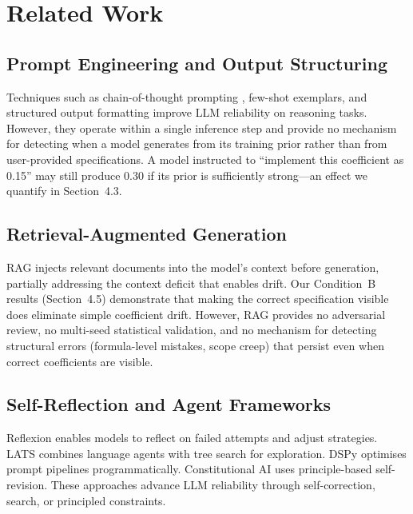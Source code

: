 \documentclass[11pt,a4paper]{article}
\begin{document}
\section{Related Work}

\subsection{Prompt Engineering and Output Structuring}

Techniques such as chain-of-thought prompting \citep{wei2022}, few-shot exemplars, and structured output formatting improve LLM reliability on reasoning tasks. However, they operate within a single inference step and provide no mechanism for detecting when a model generates from its training prior rather than from user-provided specifications. A model instructed to ``implement this coefficient as 0.15'' may still produce 0.30 if its prior is sufficiently strong---an effect we quantify in Section~4.3.

\subsection{Retrieval-Augmented Generation}

RAG \citep{lewis2020} injects relevant documents into the model's context before generation, partially addressing the context deficit that enables drift. Our Condition~B results (Section~4.5) demonstrate that making the correct specification visible does eliminate simple coefficient drift. However, RAG provides no adversarial review, no multi-seed statistical validation, and no mechanism for detecting structural errors (formula-level mistakes, scope creep) that persist even when correct coefficients are visible.

\subsection{Self-Reflection and Agent Frameworks}

Reflexion \citep{shinn2023} enables models to reflect on failed attempts and adjust strategies. LATS \citep{zhou2023} combines language agents with tree search for exploration. DSPy \citep{khattab2023} optimises prompt pipelines programmatically. Constitutional AI \citep{bai2022} uses principle-based self-revision. These approaches advance LLM reliability through self-correction, search, or principled constraints.
\end{document}
